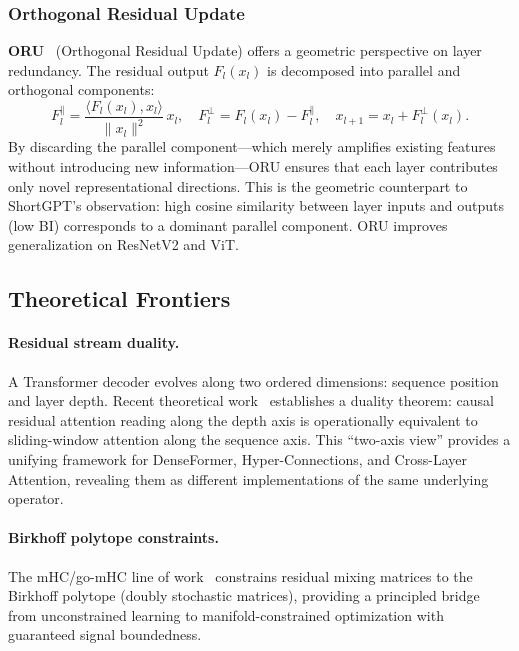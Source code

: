 \subsubsection{Orthogonal Residual Update}

\textbf{ORU}~\cite{oh2025revisiting} (Orthogonal Residual Update) offers a geometric perspective on layer redundancy. The residual output $F_l(x_l)$ is decomposed into parallel and orthogonal components:
\begin{equation}
  F_l^{\parallel} = \frac{\langle F_l(x_l), x_l \rangle}{\|x_l\|^2}\,x_l, \quad
  F_l^{\perp} = F_l(x_l) - F_l^{\parallel}, \quad
  x_{l+1} = x_l + F_l^{\perp}(x_l).
  \label{eq:oru}
\end{equation}
By discarding the parallel component---which merely amplifies existing features without introducing new information---ORU ensures that each layer contributes only novel representational directions. This is the geometric counterpart to ShortGPT's observation: high cosine similarity between layer inputs and outputs (low BI) corresponds to a dominant parallel component. ORU improves generalization on ResNetV2 and ViT.

\subsection{Theoretical Frontiers}
\label{subsec:residual_theory}

\paragraph{Residual stream duality.}
A Transformer decoder evolves along two ordered dimensions: sequence position and layer depth. Recent theoretical work~\cite{residualduality2026} establishes a duality theorem: causal residual attention reading along the depth axis is operationally equivalent to sliding-window attention along the sequence axis. This ``two-axis view'' provides a unifying framework for DenseFormer, Hyper-Connections, and Cross-Layer Attention, revealing them as different implementations of the same underlying operator.

\paragraph{Birkhoff polytope constraints.}
The mHC/go-mHC line of work~\cite{xie2025mhc,gomhc2026} constrains residual mixing matrices to the Birkhoff polytope (doubly stochastic matrices), providing a principled bridge from unconstrained learning to manifold-constrained optimization with guaranteed signal boundedness.

